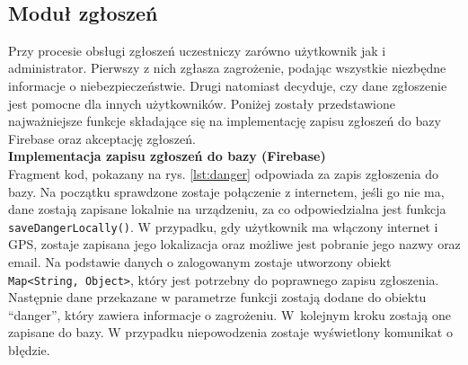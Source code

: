 \noindent
\setlength{\fboxrule}{0.5pt}
\begin{minipage}{\linewidth}
    \label{lst:rystras}
    \centering
\end{minipage}
\\

\subsection{Moduł zgłoszeń}
Przy procesie obsługi zgłoszeń uczestniczy zarówno użytkownik jak i administrator. Pierwszy z nich zgłasza zagrożenie, podając wszystkie niezbędne informacje o niebezpieczeństwie. Drugi natomiast decyduje, czy dane zgłoszenie jest pomocne dla innych użytkowników.  Poniżej zostały przedstawione najważniejsze funkcje składające się na implementację zapisu zgłoszeń do bazy Firebase oraz akceptację zgłoszeń.
\\

\noindent
\textbf{Implementacja zapisu zgłoszeń do bazy (Firebase)} \\ 
\indent Fragment kod, pokazany na rys. \ref{lst:danger} odpowiada za zapis zgłoszenia do bazy. Na początku sprawdzone zostaje połączenie z internetem, jeśli go nie ma, dane zostają zapisane lokalnie na urządzeniu, za co odpowiedzialna jest funkcja \verb|saveDangerLocally()|. W przypadku, gdy użytkownik ma włączony internet i GPS, zostaje zapisana jego lokalizacja oraz możliwe jest pobranie jego nazwy oraz email. Na podstawie danych o zalogowanym zostaje utworzony obiekt  \verb|Map<String, Object>|, który jest potrzebny do poprawnego zapisu zgłoszenia. Następnie dane przekazane w parametrze funkcji zostają dodane do obiektu “danger”, który zawiera informacje o zagrożeniu. W~kolejnym kroku zostają one zapisane do bazy. W przypadku niepowodzenia zostaje wyświetlony komunikat o błędzie. \\

